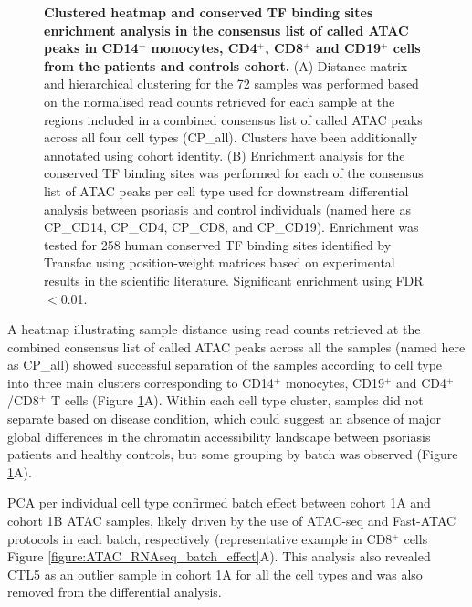 \begin{figure}[htbp]
\caption[Clustered heatmap and conserved TF binding sites enrichment analysis in the consensus list of called ATAC peaks in CD14$^+$ monocytes, CD4$^+$, CD8$^+$ and CD19$^+$ cells from the patients and controls cohort.]{\textbf{Clustered heatmap and conserved TF binding sites enrichment analysis in the consensus list of called ATAC peaks in CD14$^+$ monocytes, CD4$^+$, CD8$^+$ and CD19$^+$ cells from the patients and controls cohort.} (A) Distance matrix and hierarchical clustering for the 72 samples was performed based on the normalised read counts retrieved for each sample at the regions included in a combined consensus list of called ATAC peaks across all four cell types (CP\_all). Clusters have been additionally annotated using cohort identity. (B) Enrichment analysis for the conserved TF binding sites was performed for each of the consensus list of ATAC peaks per cell type used for downstream differential analysis between psoriasis and control individuals (named here as CP\_CD14, CP\_CD4, CP\_CD8, and CP\_CD19). Enrichment was tested for 258 human conserved TF binding sites identified by Transfac using position-weight matrices based on experimental results in the scientific literature. Significant enrichment using FDR$<$0.01.}
\label{figure:ATAC_PS_CTL_heatmap_TFBS}
\end{figure}

A heatmap illustrating sample distance using read counts retrieved at the combined consensus list of called ATAC peaks across all the samples (named here as CP\_all) showed successful separation of the samples according to cell type into three main clusters corresponding to CD14$^+$ monocytes, CD19$^+$ and CD4$^+$/CD8$^+$ T cells (Figure \ref{figure:ATAC_PS_CTL_heatmap_TFBS}A). Within each cell type cluster, samples did not separate based on disease condition, which could suggest an absence of major global differences in the chromatin accessibility landscape between psoriasis patients and healthy controls, but some grouping by batch was observed (Figure \ref{figure:ATAC_PS_CTL_heatmap_TFBS}A).

PCA per individual cell type confirmed batch effect between cohort 1A and cohort 1B ATAC samples, likely driven by the use of ATAC-seq and Fast-ATAC protocols in each batch, respectively (representative example in CD8$^+$ cells Figure \ref{figure:ATAC_RNAseq_batch_effect}A). This analysis also revealed CTL5 as an outlier sample in cohort 1A for all the cell types and was also removed from the differential analysis.


